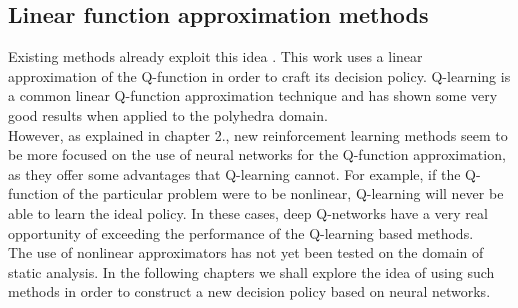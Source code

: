 \subsection{Linear function approximation methods}

Existing methods already exploit this idea \cite{singh2018fast}. This work uses a linear approximation of the Q-function in order to craft its decision policy. Q-learning is a common linear Q-function approximation technique and has shown some very good results when applied to the polyhedra domain.\\
However, as explained in chapter 2., new reinforcement learning methods seem to be more focused on the use of neural networks for the Q-function approximation, as they offer some advantages that Q-learning cannot. For example, if the Q-function of the particular problem were to be nonlinear, Q-learning will never be able to learn the ideal policy. In these cases, deep Q-networks have a very real opportunity of exceeding the performance of the Q-learning based methods.\\
The use of nonlinear approximators has not yet been tested on the domain of static analysis. In the following chapters we shall explore the idea of using such methods in order to construct a new decision policy based on neural networks.
















